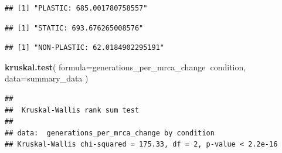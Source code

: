 \documentclass[]{book}
\newenvironment{Shaded}{\begin{snugshade}}{\end{snugshade}}
\newcommand{\DataTypeTok}[1]{\textcolor[rgb]{0.13,0.29,0.53}{#1}}
\newcommand{\KeywordTok}[1]{\textcolor[rgb]{0.13,0.29,0.53}{\textbf{#1}}}
\newcommand{\NormalTok}[1]{#1}
\newcommand{\OperatorTok}[1]{\textcolor[rgb]{0.81,0.36,0.00}{\textbf{#1}}}
\newcommand{\StringTok}[1]{\textcolor[rgb]{0.31,0.60,0.02}{#1}}
\begin{document}
\begin{verbatim}
## [1] "PLASTIC: 685.001780758557"
\end{verbatim}

\begin{Shaded}
\end{Shaded}

\begin{verbatim}
## [1] "STATIC: 693.676265008576"
\end{verbatim}

\begin{Shaded}
\end{Shaded}

\begin{verbatim}
## [1] "NON-PLASTIC: 62.0184902295191"
\end{verbatim}

\begin{Shaded}
\begin{Highlighting}[]
\KeywordTok{kruskal.test}\NormalTok{(}
  \DataTypeTok{formula=}\NormalTok{generations_per_mrca_change}\OperatorTok{~}\NormalTok{condition,}
  \DataTypeTok{data=}\NormalTok{summary_data}
\NormalTok{)}
\end{Highlighting}
\end{Shaded}

\begin{verbatim}
## 
##  Kruskal-Wallis rank sum test
## 
## data:  generations_per_mrca_change by condition
## Kruskal-Wallis chi-squared = 175.33, df = 2, p-value < 2.2e-16
\end{verbatim}

\begin{Shaded}
\end{Shaded}
\end{document}
